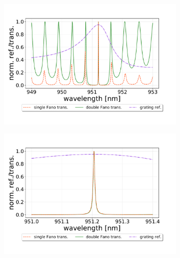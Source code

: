 \begin{figure}[h!]
    \centering
    \begin{subfigure}[c]{0.49\textwidth}
        \centering
        \includegraphics[width=\textwidth]{figures/single_and_double_1000um.pdf}
        \caption{}
        \label{fig:double_in_standard_regime}
    \end{subfigure}
    \begin{subfigure}[c]{0.49\textwidth}
        \includegraphics[width=\textwidth]{figures/single_and_double_1000um_zoomed.pdf}
        \caption{}
        \label{fig:double_in_standard_regime_zoomed}
    \end{subfigure}
    \begin{subfigure}[c]{0.49\textwidth}
        \centering

\end{subfigure}
\end{figure}
